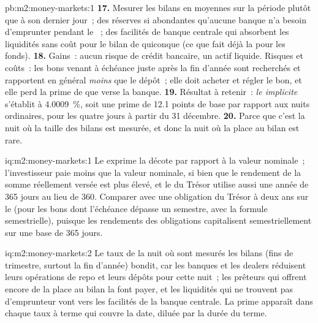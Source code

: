 \begin{solution}{pb:m2:money-markets:1}
\textbf{17.} Mesurer les bilans en moyennes sur la période plutôt que
à son dernier jour~; des réserves si abondantes qu'aucune banque n'a besoin d'emprunter pendant le
~; des facilités de banque centrale qui absorbent les liquidités sans coût pour le bilan de quiconque
(ce que fait déjà la  pour les fonds).
\textbf{18.} Gains~: aucun risque de crédit bancaire, un actif liquide. Risques et coûts~:
les bons venant à échéance juste après la fin d'année sont recherchés et rapportent en général
\emph{moins} que le dépôt~; elle doit acheter et régler le bon, et elle
perd la prime de  que verse la banque.
\textbf{19.} Résultat à retenir~: \emph{le  implicite} s'établit à 4.0009~\%, soit
une prime de 12.1 points de base par rapport aux nuits ordinaires, pour les quatre jours à partir du 31
décembre.
\textbf{20.} Parce que c'est la nuit où la taille des bilans est
mesurée, et donc la nuit où la place au bilan est rare.
\end{solution}

\begin{solution}{iq:m2:money-markets:1}
Le  exprime la décote par rapport à la valeur nominale~; l'investisseur paie
moins que la valeur nominale, si bien que le rendement de la somme réellement versée est plus élevé, et
le  du Trésor utilise aussi une année de 365 jours au lieu de 360.
Comparer avec une obligation du Trésor à deux ans sur le  (pour les bons dont l'échéance dépasse
un semestre, avec la formule semestrielle), puisque les rendements des obligations capitalisent
semestriellement sur une base de 365 jours.
\end{solution}

\begin{solution}{iq:m2:money-markets:2}
Le taux de la nuit où sont mesurés les bilans (fins de trimestre,
surtout la fin d'année) bondit, car les banques et les dealers réduisent leurs opérations de repo et
leurs dépôts pour cette nuit~; les prêteurs qui offrent encore de la place au bilan la font payer,
et les liquidités qui ne trouvent pas d'emprunteur vont vers les facilités de la banque centrale. La prime
apparaît dans chaque taux à terme qui couvre la date, diluée par la durée du terme.
\end{solution}


